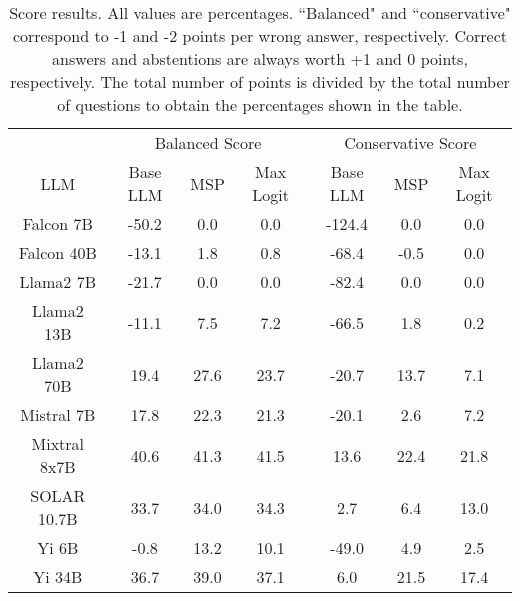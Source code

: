 \begin{table*}
\centering
\begin{tabular}{c|c|c|c|c|c|c}
& \multicolumn{3}{c|}{Balanced Score} & \multicolumn{3}{c}{Conservative Score} \\ 
LLM & Base LLM & MSP & Max Logit & Base LLM & MSP & Max Logit\\ \hline
Falcon 7B & -50.2 & 0.0 & 0.0 & -124.4 & 0.0 & 0.0\\
Falcon 40B & -13.1 & 1.8 & 0.8 & -68.4 & -0.5 & 0.0\\
Llama2 7B & -21.7 & 0.0 & 0.0 & -82.4 & 0.0 & 0.0\\
Llama2 13B & -11.1 & 7.5 & 7.2 & -66.5 & 1.8 & 0.2\\
Llama2 70B & 19.4 & 27.6 & 23.7 & -20.7 & 13.7 & 7.1\\
Mistral 7B & 17.8 & 22.3 & 21.3 & -20.1 & 2.6 & 7.2\\
Mixtral 8x7B & 40.6 & 41.3 & 41.5 & 13.6 & 22.4 & 21.8\\
SOLAR 10.7B & 33.7 & 34.0 & 34.3 & 2.7 & 6.4 & 13.0\\
Yi 6B & -0.8 & 13.2 & 10.1 & -49.0 & 4.9 & 2.5\\
Yi 34B & 36.7 & 39.0 & 37.1 & 6.0 & 21.5 & 17.4\\
\hline
\end{tabular}
\caption{Score results. All values are percentages. ``Balanced" and ``conservative" correspond to -1 and -2 points per wrong answer, respectively. Correct answers and abstentions are always worth +1 and 0 points, respectively. The total number of points is divided by the total number of questions to obtain the percentages shown in the table.}
\label{tab:score}
\end{table*}
